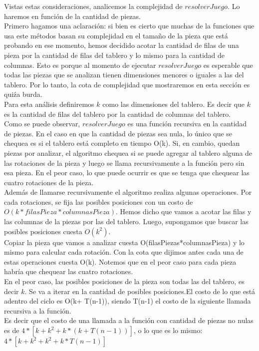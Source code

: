 \indent Vistas estas consideraciones, analicemos la complejidad de $resolverJuego$.  Lo haremos en función de la cantidad de piezas.\\
\indent Primero hagamos una aclaración: si bien es cierto que muchas de la funciones que usa este métodos basan su complejidad en el tamaño de la pieza que está probando en ese momento, hemos decidido acotar la cantidad de filas de una pieza por la cantidad de filas del tablero y lo mismo para la cantidad de columnas. Esto es porque al momento de ejecutar $resolverJuego$ es esperable que todas las piezas que se analizan tienen dimensiones menores o iguales a las del tablero. Por lo tanto, la cota de complejidad que mostraremos en esta sección es quiźa burda.\\
\indent Para esta análisis definiremos $k$ como las dimensiones del tablero. Es decir que $k$ es la cantidad de filas del tablero por la cantidad de columnas del tablero.\\

\indent Como se puede observar, $resolverJuego$ es una función recursiva en la cantidad de piezas. En el caso en que la cantidad de piezas sea nula, lo único que se chequea es si el tablero está completo en tiempo O(k).
\indent Si, en cambio, quedan piezas por analizar, el algoritmo chequea si se puede agregar al tablero alguna de las rotaciones de la pieza y luego se llama recursivamente a la función pero sin esa pieza. En el peor caso, lo que puede ocurrir es que se tenga que chequear las cuatro rotaciones de la pieza.\\
\indent Adem\'as de llamarse recursivamente el algoritmo realiza algunas operaciones. Por cada rotaciones, se fija las posibles posiciones con un costo de $O(k*filasPieza*columnasPieza)$. Hemos dicho que vamos a acotar las filas y las columnas de la piezas por las del tablero. Luego, supongamos que buscar las posibles posiciones cuesta $O(k^{2})$.\\
\indent Copiar la pieza que vamos a analizar cuesta O(filasPiezas*columnasPieza) y lo mismo para calcular cada rotación. Con la cota que dijimos antes cada una de estas operaciones cuesta O(k). Notemos que en el peor caso para cada pieza habría que chequear las cuatro rotaciones.\\
\indent En el peor caso, las posibles posiciones de la pieza son todas las del tablero, es decir $k$. Se va a iterar en la cantidad de posibles posiciones.El costo de lo que está adentro del ciclo es O(k+ T(n-1)), siendo T(n-1) el costo de la siguiente llamada recursiva a la función.\\
\indent Es decir que el costo de una llamada a la función con cantidad de piezas no nulas es de $4*[k + k^{2} + k* (k+T(n-1))]$, o lo que es lo mismo:\\
$4*[k + k^{2} + k^{2} + k* T(n-1)]$\\


